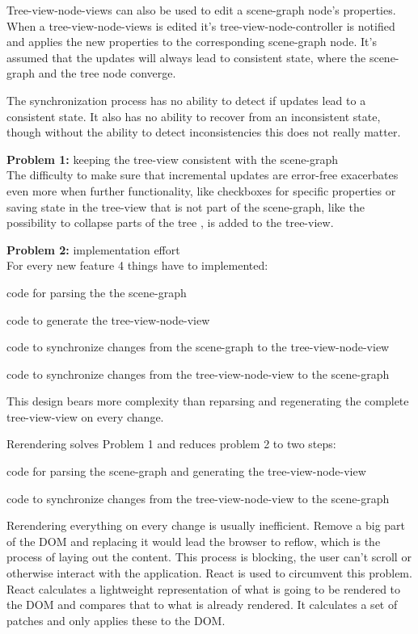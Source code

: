 Tree-view-node-views can also be used to edit a scene-graph node's
properties.\\
When a tree-view-node-views is edited it's tree-view-node-controller is
notified and applies the new properties to the corresponding scene-graph
node. It's assumed that the updates will always lead to consistent
state, where the scene-graph and the tree node converge.

The synchronization process has no ability to detect if updates lead to
a consistent state. It also has no ability to recover from an
inconsistent state, though without the ability to detect inconsistencies
this does not really matter.

\textbf{Problem 1:} keeping the tree-view consistent with the
scene-graph\\
The difficulty to make sure that incremental updates are error-free
exacerbates even more when further functionality, like checkboxes for
specific properties or saving state in the tree-view that is not part of
the scene-graph, like the possibility to collapse parts of the tree , is
added to the tree-view.

\textbf{Problem 2:} implementation effort\\
For every new feature 4 things have to implemented:
\begin{enumerate*}
  \item code for parsing the the scene-graph
  \item code to generate the tree-view-node-view
  \item code to synchronize changes from the scene-graph to the tree-view-node-view
  \item code to synchronize changes from the tree-view-node-view to the scene-graph
\end{enumerate*}

This design bears more complexity than reparsing and regenerating the
complete tree-view-view on every change.

Rerendering solves Problem 1 and reduces problem 2 to two steps:
\begin{enumerate*}
  \item code for parsing the scene-graph and generating the tree-view-node-view
  \item code to synchronize changes from the tree-view-node-view to the scene-graph
\end{enumerate*}

Rerendering everything on every change is usually inefficient. Remove a big part
of the DOM and replacing it would lead the browser to reflow, which is the
process of laying out the content. This process is blocking, the user can't
scroll or otherwise interact with the application. \cite{reflow} React is used
to circumvent this problem. React calculates a lightweight representation of
what is going to be rendered to the DOM and compares that to what is already
rendered. It calculates a set of patches and only applies these to the DOM.

